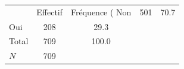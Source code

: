 {
\def\sym#1{\ifmmode^{#1}\else\(^{#1}\)\fi}
\begin{tabular}{l*{1}{cc}}
\toprule
            &    Effectif&Fréquence (%
\midrule
Non         &         501&        70.7\\
Oui         &         208&        29.3\\
Total       &         709&       100.0\\
\midrule
\(N\)       &         709&            \\
\bottomrule
\end{tabular}
}
